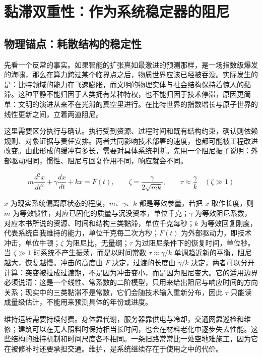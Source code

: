 \section{黏滞双重性：作为系统稳定器的阻尼}

\subsection{物理锚点：耗散结构的稳定性}

先看一个反常的事实。如果智能的扩张真如最激进的预测那样，是一场指数级爆发的海啸，那么在算力跨过某个临界点之后，物质世界应该已经被吞没。实际发生的是：比特领域的能力在飞速膨胀，而文明的物理实体与社会结构保持着惊人的黏滞。这种平静不能归因于人类拥有某种特权，也不能归因于技术停滞，原因更简单：文明的演进从来不在光滑的真空里进行。在比特世界的指数增长与原子世界的线性更新之间，立着两道阻尼。

这里需要区分执行与确认。执行受到资源、过程时间和既有结构约束，确认则依赖规则、对象证据与责任安排。两者共同影响技术部署的速度，也都可能被工程改进改变。由此形成的缓冲有多长，需要对具体系统判断。先用一个阻尼振子说明：外部驱动相同，惯性、阻尼与回复作用不同，响应就会不同。

\begin{equation}
m\frac{d^{2}x}{dt^{2}}+\gamma\frac{dx}{dt}+kx=F(t),
\qquad
\zeta=\frac{\gamma}{2\sqrt{mk}},
\qquad
\tau\approx\frac{\gamma}{k}\quad(\zeta\gg1)
\end{equation}

$x$ 为现实系统偏离原状态的程度，$m$、$\gamma$、$k$ 都是等效参量，若把 $x$ 取作长度，则 $m$ 为等效惯性，对应已固化的质量与沉没资本，单位千克；$\gamma$ 为等效阻尼系数，对应本书所说的资源、时间和结构三类黏滞，单位千克每秒；$k$ 为等效回复刚度，代表系统自我维持的能力，单位千克每二次方秒；$F(t)$ 为外部驱动力，即技术冲击，单位牛顿；$\zeta$ 为阻尼比，无量纲；$\tau$ 为过阻尼条件下的恢复时间，单位秒。当 $\zeta\gg1$ 时系统不产生振荡，而是以时间常数 $\tau\approx\gamma/k$ 单调趋近新的平衡，阻尼越大，恢复越慢。冲击的高度由 $F$ 决定，过渡的长度由 $\gamma/k$ 决定，两者可以分开计算：突变被拉成过渡期，不是因为冲击变小，而是因为阻尼变大。它的适用边界必须说清：这是一个线性、常系数的二阶模型，只用来给出阻尼与响应时间的方向关系；现实中的三类黏滞不是常数，它们会随技术输入重新分布，因此 $\tau$ 只能读成量级估计，不能用来预测具体的年份或进度。

维持运转需要持续付费。身体靠代谢，服务器靠供电与冷却，交通网靠巡检和维修；建筑可以在无人照料时保持相当长时间，也会在材料老化中逐步失去性能。这些结构的维持机制和时间尺度各不相同。一条旧路常常比一处空地难施工，因为它在被修补时还要承担交通。维护，是系统继续存在于使用之中的代价。

